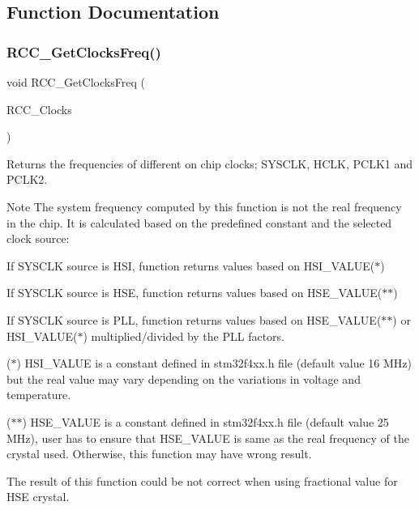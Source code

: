 \subsection{Function Documentation}
\mbox{\label{group___r_c_c___group2_ga3e9944fd1ed734275222bbb3e3f29993}} 
\subsubsection{\texorpdfstring{R\+C\+C\+\_\+\+Get\+Clocks\+Freq()}{RCC\_GetClocksFreq()}}
{\footnotesize\ttfamily void R\+C\+C\+\_\+\+Get\+Clocks\+Freq (\begin{DoxyParamCaption}\item[{\mbox{\hyperlink{struct_r_c_c___clocks_type_def}{R\+C\+C\+\_\+\+Clocks\+Type\+Def}} $\ast$}]{R\+C\+C\+\_\+\+Clocks }\end{DoxyParamCaption})}



Returns the frequencies of different on chip clocks; S\+Y\+S\+C\+LK, H\+C\+LK, P\+C\+L\+K1 and P\+C\+L\+K2. 

\begin{DoxyNote}{Note}
The system frequency computed by this function is not the real frequency in the chip. It is calculated based on the predefined constant and the selected clock source\+: 

If S\+Y\+S\+C\+LK source is H\+SI, function returns values based on H\+S\+I\+\_\+\+V\+A\+L\+U\+E($\ast$) 

If S\+Y\+S\+C\+LK source is H\+SE, function returns values based on H\+S\+E\+\_\+\+V\+A\+L\+U\+E($\ast$$\ast$) 

If S\+Y\+S\+C\+LK source is P\+LL, function returns values based on H\+S\+E\+\_\+\+V\+A\+L\+U\+E($\ast$$\ast$) or H\+S\+I\+\_\+\+V\+A\+L\+U\+E($\ast$) multiplied/divided by the P\+LL factors. ~\newline


($\ast$) H\+S\+I\+\_\+\+V\+A\+L\+UE is a constant defined in stm32f4xx.\+h file (default value 16 M\+Hz) but the real value may vary depending on the variations in voltage and temperature. 

($\ast$$\ast$) H\+S\+E\+\_\+\+V\+A\+L\+UE is a constant defined in stm32f4xx.\+h file (default value 25 M\+Hz), user has to ensure that H\+S\+E\+\_\+\+V\+A\+L\+UE is same as the real frequency of the crystal used. Otherwise, this function may have wrong result.

The result of this function could be not correct when using fractional value for H\+SE crystal.
\end{DoxyNote}


